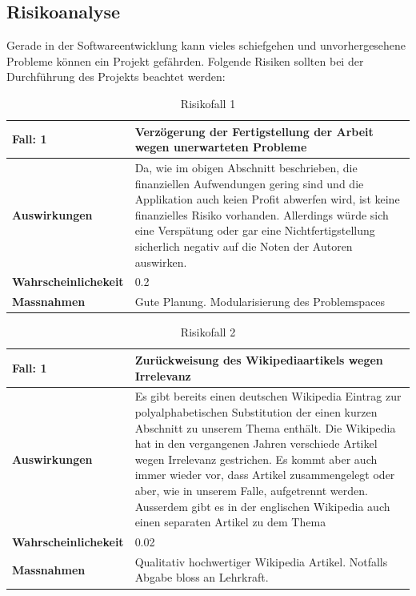 \documentclass[11pt,paper=a4,final]{scrartcl}
\begin{document}
\subsection{Risikoanalyse}
Gerade in der Softwareentwicklung kann vieles schiefgehen und unvorhergesehene
Probleme k\"onnen ein Projekt gef\"ahrden. Folgende Risiken sollten bei der
Durchführung des Projekts beachtet werden:
\begin{table}[h!]
  \centering
  \begin{tabular}{|l|p{12cm}|}\hline
    \bf Fall: 1 & \bf Verz\"ogerung der Fertigstellung der Arbeit wegen
    unerwarteten Probleme \\ \hline
    \bf Auswirkungen & Da, wie im obigen Abschnitt beschrieben, die finanziellen
    Aufwendungen gering sind und die Applikation auch keien Profit abwerfen
    wird, ist keine finanzielles Risiko vorhanden. Allerdings w\"urde sich eine
    Versp\"atung oder gar eine Nichtfertigstellung sicherlich negativ auf die
    Noten der Autoren auswirken. \\ \hline
    \bf Wahrscheinlichekeit & 0.2 \\ \hline
    \bf Massnahmen & Gute Planung. Modularisierung des Problemspaces \\ \hline
  \end{tabular}
  \caption{Risikofall 1}
  \label{tab:risiko1}
\end{table}
\begin{table}[h!]
  \centering
  \begin{tabular}{|l|p{12cm}|}\hline
    \bf Fall: 1 & \bf Zur\"uckweisung des Wikipediaartikels wegen Irrelevanz
    \\ \hline
    \bf Auswirkungen & Es gibt bereits einen deutschen Wikipedia Eintrag zur
    polyalphabetischen Substitution der einen kurzen Abschnitt zu unserem Thema
    enth\"alt. Die Wikipedia hat in den vergangenen Jahren verschiede Artikel
    wegen Irrelevanz gestrichen. Es kommt aber auch immer wieder vor, dass
    Artikel zusammengelegt oder aber, wie in unserem Falle, aufgetrennt werden.
    Ausserdem gibt es in der englischen Wikipedia auch einen separaten Artikel
    zu dem Thema \\ \hline
    \bf Wahrscheinlichekeit & 0.02 \\ \hline
    \bf Massnahmen & Qualitativ hochwertiger Wikipedia Artikel. Notfalls Abgabe
    bloss an Lehrkraft. \\ \hline
  \end{tabular}
  \caption{Risikofall 2}
  \label{tab:risiko2}
\end{table}
\end{document}
